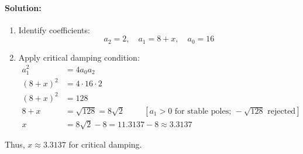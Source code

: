 \begin{enumerate}
  \paragraph{Solution:}
  \begin{enumerate}
    \item Identify coefficients:
      \[ a_2 = 2, \quad a_1 = 8 + x, \quad a_0 = 16 \]
    \item Apply critical damping condition:
      \begin{align*}
        a_1^2 &= 4 a_0 a_2 \\
        (8 + x)^2 &= 4 \cdot 16 \cdot 2 \\
        (8 + x)^2 &= 128 \\
        8 + x &= \sqrt{128} = 8\sqrt{2} \hspace{1cm} [a_1 > 0 \text{ for stable poles; } -\sqrt{128} \text{ rejected}] \\
        x &= 8\sqrt{2} - 8 = 11.3137 - 8 \approx 3.3137
      \end{align*}
  \end{enumerate}
  Thus, \( x \approx 3.3137 \) for critical damping.
\end{enumerate}
